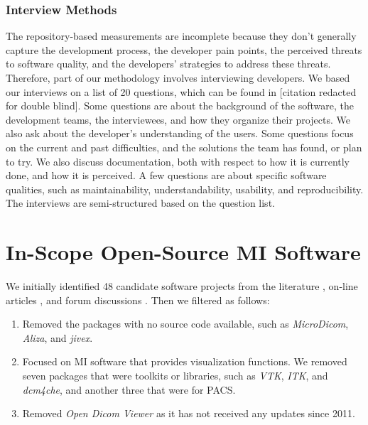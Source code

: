 \documentclass[final, 12pt, 3p, times]{elsarticle}
\begin{document}
\subsubsection{Interview Methods} \label{sec_interview_methods}

The repository-based measurements are incomplete because they don't generally
capture the development process, the developer pain points, the perceived
threats to software quality, and the developers' strategies to address these
threats.  Therefore, part of our methodology involves interviewing developers.
We based our interviews on a list of 20 questions, which can be found in
[citation redacted for double blind].
Some questions are about the background of the software, the development teams,
the interviewees, and how they organize their projects.  We also ask about the
developer's understanding of the users. Some questions focus on the current and
past difficulties, and the solutions the team has found, or plan to try. We also
discuss documentation, both with respect to how it is currently done, and how it
is perceived. A few questions are about specific software qualities, such as
maintainability, understandability, usability, and reproducibility. The
interviews are semi-structured based on the question list.

\section{In-Scope Open-Source MI Software} \label{SecWhatProjects}

We initially identified 48 candidate software projects from the literature
\cite{Bjorn2017, Bruhschwein2019, Haak2015}, on-line articles \cite{Emms2019,
Hasan2020, Mu2019}, and forum discussions \cite{Samala2014}.  Then we filtered
as follows:

\begin{enumerate}

\item Removed the packages with no source code available, such as
\textit{MicroDicom}, \textit{Aliza}, and \textit{jivex}.

\item Focused on MI software that provides visualization functions.  We removed
seven packages that were toolkits or libraries, such as \textit{VTK},
\textit{ITK}, and \textit{dcm4che}, and another three that were for PACS.

\item Removed \textit{Open Dicom Viewer} as it has not received any
updates since 2011.

\end{enumerate}
\end{document}
